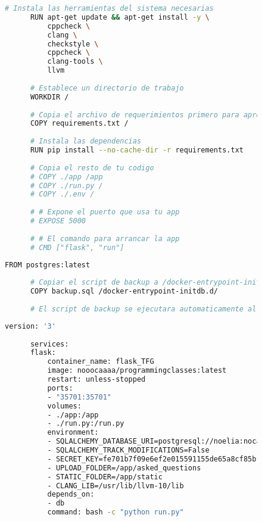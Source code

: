 \begin{appendices}
\begin{figure}[H]
\begin{lstlisting}[language=bash, caption={Dockerfile para la creación de la imagen de la app}, label=fig:dockerfileapp]
      # Instala las herramientas del sistema necesarias
      RUN apt-get update && apt-get install -y \
          cppcheck \
          clang \
          checkstyle \
          cppcheck \
          clang-tools \
          llvm 
      
      # Establece un directorio de trabajo
      WORKDIR /
      
      # Copia el archivo de requerimientos primero para aprovechar la cache de Docker
      COPY requirements.txt /
      
      # Instala las dependencias
      RUN pip install --no-cache-dir -r requirements.txt
      
      # Copia el resto de tu codigo
      # COPY ./app /app
      # COPY ./run.py /
      # COPY ./.env /
      
      # # Expone el puerto que usa tu app
      # EXPOSE 5000
      
      # # El comando para arrancar la app
      # CMD ["flask", "run"]
    \end{lstlisting}
  \end{figure}

  \begin{figure}[H]
    \centering
    \begin{lstlisting}[language=bash, caption={Dockerfile para la creación de la imagen de la base de datos}, label=fig:dockerfilebbdd]
      FROM postgres:latest
  
      # Copiar el script de backup a /docker-entrypoint-initdb.d
      COPY backup.sql /docker-entrypoint-initdb.d/
      
      # El script de backup se ejecutara automaticamente al iniciar el contenedor
    \end{lstlisting}
  \end{figure}

  \begin{figure}[H]
    \centering
    \begin{lstlisting}[language=bash, caption={Fichero Podman-compose para desplegar la bbdd y la app en el servidor}, label=fig:podmancompose]
      version: '3'
  
      services:
      flask:
          container_name: flask_TFG
          image: nooocaaaa/programmingclasses:latest
          restart: unless-stopped
          ports:
          - "35701:35701"
          volumes:
          - ./app:/app
          - ./run.py:/run.py
          environment:
          - SQLALCHEMY_DATABASE_URI=postgresql://noelia:nocavi12@db:5432/mydatabase
          - SQLALCHEMY_TRACK_MODIFICATIONS=False
          - SECRET_KEY=fe701b7f09e6ef2e015591155de65a8cf85b160e6a75490a
          - UPLOAD_FOLDER=/app/asked_questions
          - STATIC_FOLDER=/app/static
          - CLANG_LIB=/usr/lib/llvm-10/lib
          depends_on:
          - db
          command: bash -c "python run.py"
  

\end{lstlisting}
\end{figure}
\end{appendices}
